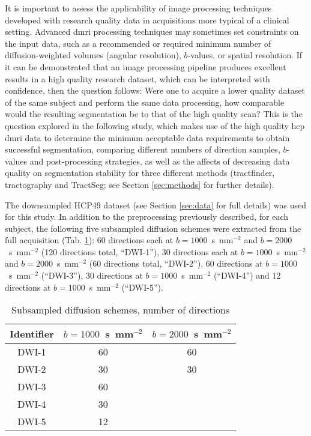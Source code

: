 \documentclass[12pt,phd,a4paper,twoside]{ucl_thesis}
\begin{document}
It is important to assess the applicability of image processing techniques developed with research quality data in acquisitions more typical of a clinical setting.
Advanced \gls{dmri} processing techniques may sometimes set constraints on the input data, such as a recommended or required minimum number of diffusion-weighted volumes (angular resolution), $b$-values, or spatial resolution.
If it can be demonstrated that an image processing pipeline produces excellent results in a high quality research dataset, which can be interpreted with confidence, then the question follows:
Were one to acquire a lower quality dataset of the same subject and perform the same data processing, how comparable would the resulting segmentation be to that of the high quality scan?
This is the question explored in the following study, which makes use of the high quality \gls{hcp} \gls{dmri} data to determine the minimum acceptable data requirements to obtain successful segmentation, comparing different numbers of direction samples, $b$-values and post-processing strategies, as well as the affects of decreasing data quality on segmentation stability for three different methods (tractfinder, tractography and TractSeg; see Section \ref{sec:methods} for further details).



The downsampled HCP49 dataset (see Section \ref{sec:data} for full details) was used for this study.
In addition to the preprocessing previously described, for each subject, the following five subsampled diffusion schemes were extracted from the full acquisition (Tab. \ref{tab:subschemes}):
60 directions each at $b=1000$~s~mm$^{-2}$ and $b=2000$~s~mm$^{-2}$ (120 directions total, ``DWI-1”), 30 directions each at $b=1000$~s~mm$^{-2}$ and $b=2000$~s~mm$^{-2}$ (60 directions total, ``DWI-2”), 60 directions at $b=1000$~s~mm$^{-2}$ (``DWI-3”), 30 directions at $b=1000$~s~mm$^{-2}$ (``DWI-4”) and 12 directions at $b=1000$~s~mm$^{-2}$ (``DWI-5”).

\begin{table}
  \centering
  \begin{tabular}{c c c} \toprule
    Identifier & $b=1000$~s~mm$^{-2}$ & $b=2000$~s~mm$^{-2}$ \\
    \midrule
    DWI-1 & 60 & 60 \\
    DWI-2 & 30 & 30 \\
    DWI-3 & 60 &    \\
    DWI-4 & 30 &    \\
    DWI-5 & 12 &    \\ \bottomrule
  \end{tabular}
  \caption[Subsampled diffusion schemes for data stability analysis]{Subsampled diffusion schemes, number of directions}
  \label{tab:subschemes}
\end{table}
\end{document}
